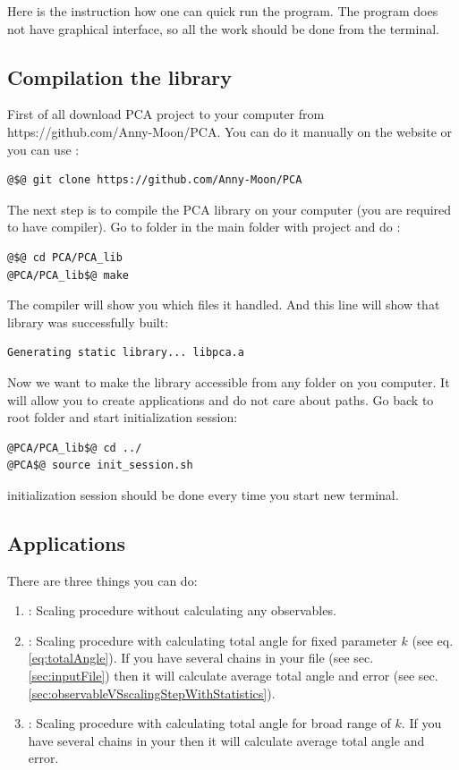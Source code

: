 \documentclass[12pt]{article}
\begin{document}
\begin{mySection}\label{sec:classPolymer}
Here is the instruction how one can quick run the program. The program does not have graphical interface, so all the work should be done from the terminal.
\subsection{Compilation the library}
First of all download PCA project to your computer from https://github.com/Anny-Moon/PCA. You can do it manually on the website or you can use :
\begin{lstlisting}
@$@ git clone https://github.com/Anny-Moon/PCA
\end{lstlisting}
The next step is to compile the PCA library on your computer (you are required to have  compiler). Go to folder  in the main folder with project and do :
\begin{lstlisting}
@$@ cd PCA/PCA_lib
@PCA/PCA_lib$@ make
\end{lstlisting}
The compiler will show you which files it handled. And this line will show that library was successfully built:
\begin{lstlisting}
Generating static library... libpca.a
\end{lstlisting}
Now we want to make the library accessible from any folder on you computer. It will allow you to create applications and do not care about paths. Go back to root folder and start initialization session:
\begin{lstlisting}
@PCA/PCA_lib$@ cd ../
@PCA$@ source init_session.sh
\end{lstlisting}
\important initialization session should be done every time you start new terminal.


\subsection{Applications}
There are three things you can do:
\begin{enumerate}
\item {}: Scaling procedure without calculating any observables.
\item {}: Scaling procedure with calculating total angle for fixed parameter $k$ (see eq. \ref{eq:totalAngle}). If you have several chains in your file (see sec. \ref{sec:inputFile}) then it will calculate average total angle and error (see sec. \ref{sec:observableVSscalingStepWithStatistics}).
\item {}: Scaling procedure with calculating total angle for broad range of $k$. If you have several chains in your  then it will calculate average total angle and error.
\end{enumerate}


\end{mySection}
\end{document}
